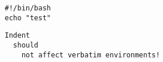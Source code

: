 \begin{verbatim}
#!/bin/bash
echo "test"
    \end{verbatim}

  \begin{lstlisting}
Indent
  should
    not affect verbatim environments!
    \end{lstlisting}
